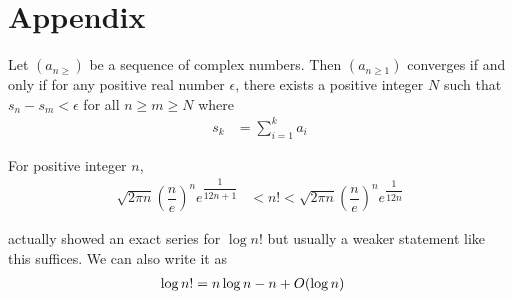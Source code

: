 \documentclass[elemannt.tex]{subfile}
\begin{document}
	\chapter{Appendix}
		\begin{theorem}\label{thm:cauchyconvergence}
			Let $(a_{n\geq})$ be a sequence of complex numbers. Then $(a_{n\geq1})$ converges if and only if for any positive real number $\epsilon$, there exists a positive integer $N$ such that $s_{n}-s_{m}<\epsilon$ for all $n\geq m\geq N$ where
				\begin{align*}
					s_{k}
						& = \sum_{i=1}^{k}a_{i}
				\end{align*}
		\end{theorem}

		\begin{theorem}\label{thm:stirling}
			For positive integer $n$,
				\begin{align*}
					\sqrt{2\pi n}\left(\dfrac{n}{e}\right)^{n}e^{\dfrac{1}{12n+1}}
						& < n! < \sqrt{2\pi n}\left(\dfrac{n}{e}\right)^{n}e^{\dfrac{1}{12n}}
				\end{align*}
		\end{theorem}
	\textcite{stirling_1730} actually showed an exact series for $\log{n!}$ but usually a weaker statement like this suffices. We can also write it as
		\begin{align*}
			\log{n!}
				& = n\log{n}-n+\bigo{\log{n}}
		\end{align*}
\end{document}
